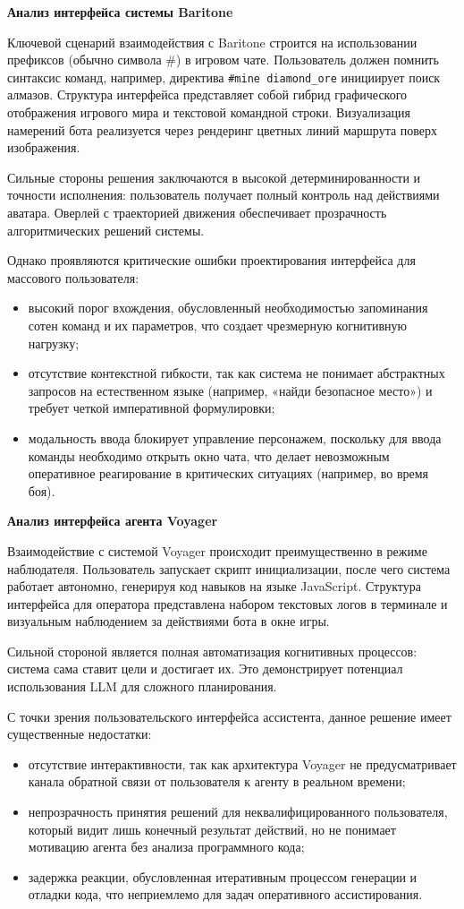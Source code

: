 \textbf{Анализ интерфейса системы Baritone}

Ключевой сценарий взаимодействия с Baritone строится на использовании префиксов (обычно символа \#) в игровом чате. Пользователь должен помнить синтаксис команд, например, директива \texttt{\#mine diamond\_ore} инициирует поиск алмазов.
Структура интерфейса представляет собой гибрид графического отображения игрового мира и текстовой командной строки. Визуализация намерений бота реализуется через рендеринг цветных линий маршрута поверх изображения.

Сильные стороны решения заключаются в высокой детерминированности и точности исполнения: пользователь получает полный контроль над действиями аватара. Оверлей с траекторией движения обеспечивает прозрачность алгоритмических решений системы.

Однако проявляются критические ошибки проектирования интерфейса для массового пользователя:
\begin{itemize}
    \item высокий порог вхождения, обусловленный необходимостью запоминания сотен команд и их параметров, что создает чрезмерную когнитивную нагрузку;
    \item отсутствие контекстной гибкости, так как система не понимает абстрактных запросов на естественном языке (например, «найди безопасное место») и требует четкой императивной формулировки;
    \item модальность ввода блокирует управление персонажем, поскольку для ввода команды необходимо открыть окно чата, что делает невозможным оперативное реагирование в критических ситуациях (например, во время боя).
\end{itemize}

\textbf{Анализ интерфейса агента Voyager}

Взаимодействие с системой Voyager происходит преимущественно в режиме наблюдателя. Пользователь запускает скрипт инициализации, после чего система работает автономно, генерируя код навыков на языке JavaScript. Структура интерфейса для оператора представлена набором текстовых логов в терминале и визуальным наблюдением за действиями бота в окне игры.

Сильной стороной является полная автоматизация когнитивных процессов: система сама ставит цели и достигает их. Это демонстрирует потенциал использования LLM для сложного планирования.

С точки зрения пользовательского интерфейса ассистента, данное решение имеет существенные недостатки:
\begin{itemize}
    \item отсутствие интерактивности, так как архитектура Voyager не предусматривает канала обратной связи от пользователя к агенту в реальном времени;
    \item непрозрачность принятия решений для неквалифицированного пользователя, который видит лишь конечный результат действий, но не понимает мотивацию агента без анализа программного кода;
    \item задержка реакции, обусловленная итеративным процессом генерации и отладки кода, что неприемлемо для задач оперативного ассистирования.
\end{itemize}

